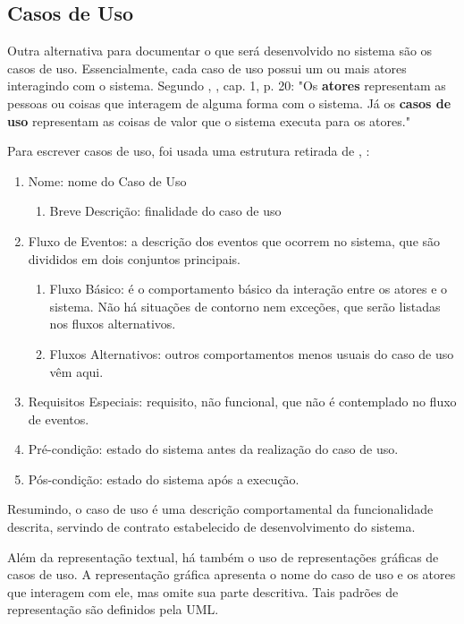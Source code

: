 \subsection{Casos de Uso}
Outra alternativa para documentar o que será desenvolvido no sistema são os casos de uso. Essencialmente, cada caso de uso possui um ou mais atores interagindo com o sistema. Segundo \citeauthor{kurtbittnerianspence2002}, \citeyear{kurtbittnerianspence2002}, cap. 1, p. 20: "Os \textbf{atores} representam as pessoas ou coisas que interagem de alguma forma com o sistema. Já os \textbf{casos de uso} representam as coisas de valor que o sistema executa para os atores."

Para escrever casos de uso, foi usada uma estrutura retirada de \citeauthor{ibm2011}, \citeyear{ibm2011}:

\begin{enumerate}
    \item Nome: nome do Caso de Uso
    \begin{enumerate}
        \item Breve Descrição: finalidade do caso de uso
    \end{enumerate}
    \item Fluxo de Eventos: a descrição dos eventos que ocorrem no sistema, que são divididos em dois conjuntos principais.
    \begin{enumerate}
        \item Fluxo Básico: é o comportamento básico da interação entre os atores e o sistema. Não há situações de contorno nem exceções, que serão listadas nos fluxos alternativos.
        \item Fluxos Alternativos: outros comportamentos menos usuais do caso de uso vêm aqui.
    \end{enumerate}
    \item Requisitos Especiais: requisito, não funcional, que não é contemplado no fluxo de eventos.
    \item Pré-condição: estado do sistema antes da realização do caso de uso.
    \item Pós-condição: estado do sistema após a execução.
\end{enumerate}

Resumindo, o caso de uso é uma descrição comportamental da funcionalidade descrita, servindo de contrato estabelecido de desenvolvimento do sistema.

Além da representação textual, há também o uso de representações gráficas de casos de uso. A representação gráfica apresenta o nome do caso de uso e os atores que interagem com ele, mas omite sua parte descritiva. Tais padrões de representação são definidos pela UML\cite{uml2017}.

